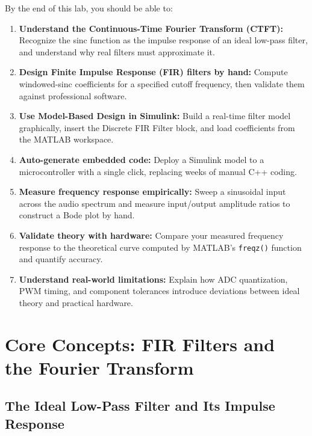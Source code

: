 \documentclass[11pt,letterpaper]{article}
\begin{document}
By the end of this lab, you should be able to:

\begin{enumerate}
    \item \textbf{Understand the Continuous-Time Fourier Transform (CTFT):} Recognize the sinc function as the impulse response of an ideal low-pass filter, and understand why real filters must approximate it.

    \item \textbf{Design Finite Impulse Response (FIR) filters by hand:} Compute windowed-sinc coefficients for a specified cutoff frequency, then validate them against professional software.

    \item \textbf{Use Model-Based Design in Simulink:} Build a real-time filter model graphically, insert the Discrete FIR Filter block, and load coefficients from the MATLAB workspace.

    \item \textbf{Auto-generate embedded code:} Deploy a Simulink model to a microcontroller with a single click, replacing weeks of manual C++ coding.

    \item \textbf{Measure frequency response empirically:} Sweep a sinusoidal input across the audio spectrum and measure input/output amplitude ratios to construct a Bode plot by hand.

    \item \textbf{Validate theory with hardware:} Compare your measured frequency response to the theoretical curve computed by MATLAB's \texttt{freqz()} function and quantify accuracy.

    \item \textbf{Understand real-world limitations:} Explain how ADC quantization, PWM timing, and component tolerances introduce deviations between ideal theory and practical hardware.
\end{enumerate}

\clearpage

\section{Core Concepts: FIR Filters and the Fourier Transform}

\subsection{The Ideal Low-Pass Filter and Its Impulse Response}
\end{document}
